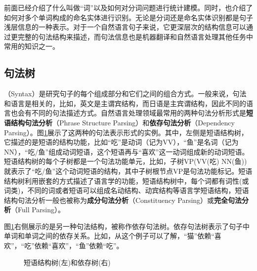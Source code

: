 \parinterval 前面已经介绍了什么叫做“词”以及如何对分词问题进行统计建模。同时，也介绍了如何对多个单词构成的命名实体进行识别。无论是分词还是命名实体识别都是句子浅层信息的一种表示。对于一个自然语言句子来说，它更深层次的结构信息可以通过更完整的句法结构来描述，而句法信息也是机器翻译和自然语言处理其他任务中常用的知识之一。


\subsection{句法树}

（Syntax）是研究句子的每个组成部分和它们之间的组合方式。一般来说，句法和语言是相关的，比如，英文是主谓宾结构，而日语是主宾谓结构，因此不同的语言也会有不同的句法描述方式。自然语言处理领域最常用的两种句法分析形式是{\small\sffamily\bfseries{短语结构句法分析}}（Phrase Structure Parsing）和{\small\sffamily\bfseries{依存句法分析}}（Dependency Parsing）。图\ref{fig:3.4-1}展示了这两种的句法表示形式的实例。其中，左侧是短语结构树，它描述的是短语的结构功能，比如“吃”是动词（记为VV），“鱼”是名词（记为NN），“吃/鱼”组成动词短语，这个短语再与“喜欢”这一动词组成新的动词短语。短语结构树的每个子树都是一个句法功能单元，比如，子树VP(VV(吃) NN(鱼))就表示了“吃/鱼”这个动词短语的结构，其中子树根节点VP是句法功能标记。短语结构树利用嵌套的方式描述了语言学的功能，短语结构树中，每个词都有词性(或词类)，不同的词或者短语可以组成名动结构、动宾结构等语言学短语结构，短语结构句法分析一般也被称为{\small\sffamily\bfseries{成分句法分析}}（Constituency Parsing）或{\small\sffamily\bfseries{完全句法分析}}（Full Parsing）。

\parinterval 图\ref{fig:3.4-1}右侧展示的是另一种句法结构，被称作依存句法树。依存句法树表示了句子中单词和单词之间的依存关系。比如，从这个例子可以了解，“猫”依赖“喜欢”，“吃”依赖“喜欢”，“鱼”依赖“吃”。

\begin{figure}[htp]
    \centering

    \caption{短语结构树(左)和依存树(右)}
    \label{fig:3.4-1}
\end{figure}

